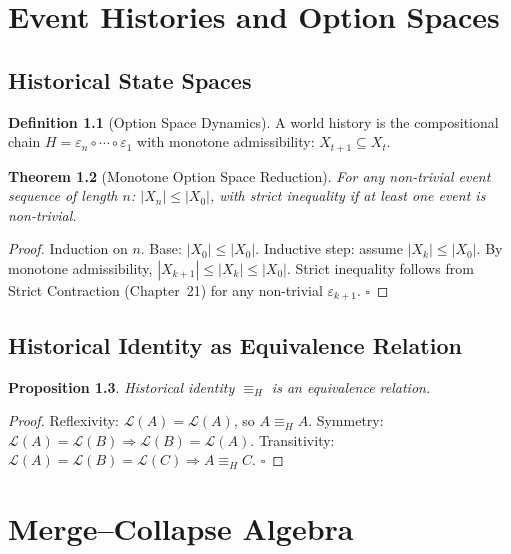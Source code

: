 \documentclass[11pt,a4paper,openany]{book}
\theoremstyle{plain}
\newtheorem{theorem}{Theorem}[chapter]
\newtheorem{proposition}[theorem]{Proposition}
\theoremstyle{definition}
\newtheorem{definition}[theorem]{Definition}
\theoremstyle{remark}
\begin{document}
\chapter{Event Histories and Option Spaces}
\label{app:events}

\section{Historical State Spaces}

\begin{definition}[Option Space Dynamics]
  A world history is the compositional chain
  $H = \varepsilon_n \circ \cdots \circ \varepsilon_1$
  with monotone admissibility: $X_{t+1} \subseteq X_t$.
\end{definition}

\begin{theorem}[Monotone Option Space Reduction]
  For any non-trivial event sequence of length $n$:
  $|X_n| \leq |X_0|$, with strict inequality if at least one event
  is non-trivial.
\end{theorem}
\begin{proof}
  Induction on $n$. Base: $|X_0| \leq |X_0|$. Inductive step: assume
  $|X_k| \leq |X_0|$. By monotone admissibility,
  $|X_{k+1}| \leq |X_k| \leq |X_0|$.
  Strict inequality follows from Strict Contraction (Chapter~21)
  for any non-trivial $\varepsilon_{k+1}$. $\square$
\end{proof}

\section{Historical Identity as Equivalence Relation}

\begin{proposition}
  Historical identity $\equiv_H$ is an equivalence relation.
\end{proposition}
\begin{proof}
  Reflexivity: $\mathcal{L}(A) = \mathcal{L}(A)$, so $A \equiv_H A$.
  Symmetry: $\mathcal{L}(A)=\mathcal{L}(B) \Rightarrow
  \mathcal{L}(B)=\mathcal{L}(A)$.
  Transitivity: $\mathcal{L}(A)=\mathcal{L}(B)=\mathcal{L}(C)
  \Rightarrow A \equiv_H C$. $\square$
\end{proof}

\chapter{Merge--Collapse Algebra}
\label{app:merge}
\end{document}
